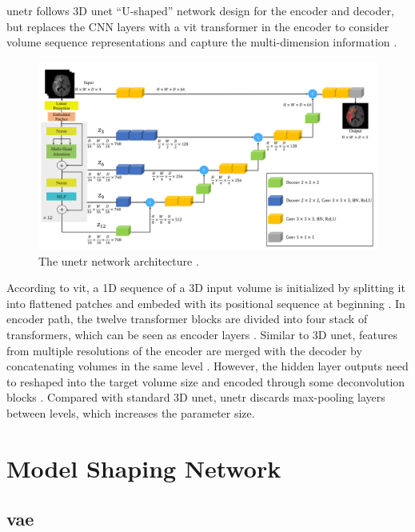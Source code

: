 \documentclass[11pt,times,oneside,openright]{eeereport}
\begin{document}
\acrfull{unetr} follows 3D \acrshort{unet} “U-shaped” network design for the encoder and decoder, but replaces the CNN layers with a \acrshort{vit} transformer in the encoder to consider volume sequence representations and capture the multi-dimension information \cite{hatamizadeh2022unetr}.

\begin{figure}[h]
    \centering
    \includegraphics[width=\textwidth]{fig/unetr.png}
    \caption{The \acrshort{unetr} network architecture \cite{hatamizadeh2022unetr}.}
    \label{fig:unetr}
\end{figure}

According to \acrshort{vit}, a 1D sequence of a 3D input volume is initialized by splitting it into flattened patches and embeded with its positional sequence at beginning \cite{hatamizadeh2022unetr}. In encoder path, the twelve transformer blocks are divided into four stack of transformers, which can be seen as encoder layers \cite{hatamizadeh2022unetr}. Similar to 3D \acrshort{unet}, features from multiple resolutions of the encoder are merged with the decoder by concatenating volumes in the same level \cite{hatamizadeh2022unetr}. However, the hidden layer outputs need to reshaped into the target volume size and encoded through some deconvolution blocks \cite{hatamizadeh2022unetr}. Compared with standard 3D \acrshort{unet}, \acrshort{unetr} discards max-pooling layers between levels, which increases the parameter size.

\section{Model Shaping Network}

\subsection{\acrlong{vae}}
\end{document}
